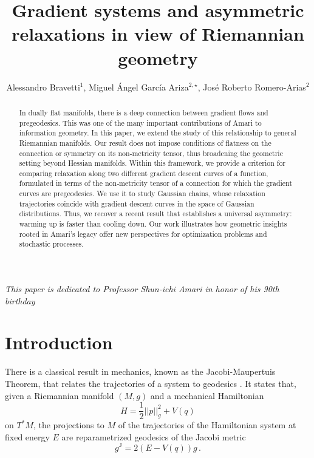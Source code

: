 \documentclass{amsart}
\title[Gradient systems and asymmetric relaxations in Riemannian Geometry]{Gradient systems and asymmetric relaxations in view of Riemannian geometry}
\author[Bravetti et al.]{Alessandro Bravetti$^1$, Miguel Ángel García Ariza$^{2,\star}$, José Roberto Romero-Arias$^2$}
\theoremstyle{definition}
\begin{document}
\begin{abstract}


    In dually flat manifolds, there is a deep connection between gradient flows and pregeodesics. This was one of the many important contributions of Amari to information geometry. In this paper, we extend the study of this relationship to general Riemannian manifolds. Our result does not impose conditions of flatness on the connection or symmetry on its non-metricity tensor, thus broadening the geometric setting beyond Hessian manifolds. Within this framework, we provide a criterion for comparing relaxation along two different gradient descent curves of a function, formulated in terms of the non‑metricity tensor of a connection for which the gradient curves are pregeodesics. We use it to study Gaussian chains, whose relaxation trajectories coincide with gradient descent curves in the space of Gaussian distributions.
    Thus, we recover a recent result that establishes a universal asymmetry: warming up is faster than cooling down. 
    Our work illustrates how geometric insights rooted in Amari’s legacy offer new perspectives for optimization problems and stochastic processes.

    
\end{abstract}

\maketitle

\begin{flushright}
{\it This paper is dedicated to Professor Shun-ichi Amari in honor of his 90th birthday}
\end{flushright}

\section{Introduction}\label{sec:intro}

There is a classical result in mechanics, known as the Jacobi-Maupertuis Theorem, that relates the trajectories of a system to geodesics \cite{Abraham1967Foundations,arnold1989mathematical,pettini2007geometry}. 
It states that, 
given a Riemannian manifold $(M,g)$ and a mechanical Hamiltonian 
$$H=\frac{1}{2}||p||_g^2+V(q)$$ on $T^*M$, the projections to $M$ of
the trajectories of the Hamiltonian system at fixed energy $E$
are reparametrized geodesics of the Jacobi metric $$g^\text{J}=2(E-V(q))g\,.$$
\end{document}
